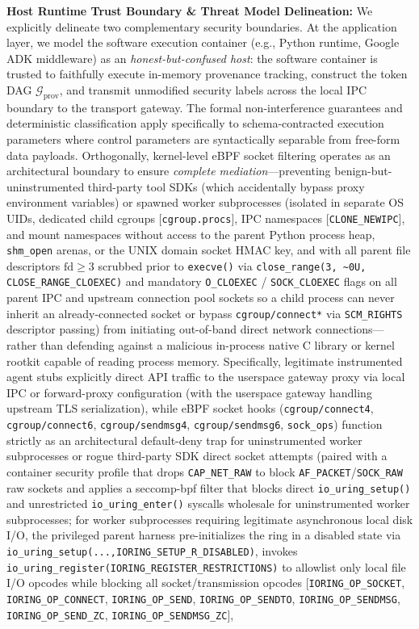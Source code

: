 \documentclass[conference,10pt]{IEEEtran}
\begin{document}
\noindent\textbf{Host Runtime Trust Boundary \& Threat Model Delineation:} We explicitly delineate two complementary security boundaries. At the application layer, we model the software execution container (e.g., Python runtime, Google ADK middleware) as an \textit{honest-but-confused host}: the software container is trusted to faithfully execute in-memory provenance tracking, construct the token DAG $\mathcal{G}_{\text{prov}}$, and transmit unmodified security labels across the local IPC boundary to the transport gateway. The formal non-interference guarantees and deterministic classification apply specifically to schema-contracted execution parameters where control parameters are syntactically separable from free-form data payloads. Orthogonally, kernel-level eBPF socket filtering operates as an architectural boundary to ensure \textit{complete mediation}---preventing benign-but-uninstrumented third-party tool SDKs (which accidentally bypass proxy environment variables) or spawned worker subprocesses (isolated in separate OS UIDs, dedicated child cgroups [\texttt{cgroup.procs}], IPC namespaces [\texttt{CLONE\_NEWIPC}], and mount namespaces without access to the parent Python process heap, \texttt{shm\_open} arenas, or the UNIX domain socket HMAC key, and with all parent file descriptors $\text{fd} \ge 3$ scrubbed prior to \texttt{execve()} via \texttt{close\_range(3, \textasciitilde{}0U, CLOSE\_RANGE\_CLOEXEC)} and mandatory \texttt{O\_CLOEXEC} / \texttt{SOCK\_CLOEXEC} flags on all parent IPC and upstream connection pool sockets so a child process can never inherit an already-connected socket or bypass \texttt{cgroup/connect*} via \texttt{SCM\_RIGHTS} descriptor passing) from initiating out-of-band direct network connections---rather than defending against a malicious in-process native C library or kernel rootkit capable of reading process memory. Specifically, legitimate instrumented agent stubs explicitly direct API traffic to the userspace gateway proxy via local IPC or forward-proxy configuration (with the userspace gateway handling upstream TLS serialization), while eBPF socket hooks (\texttt{cgroup/connect4}, \texttt{cgroup/connect6}, \texttt{cgroup/sendmsg4}, \texttt{cgroup/sendmsg6}, \texttt{sock\_ops}) function strictly as an architectural default-deny trap for uninstrumented worker subprocesses or rogue third-party SDK direct socket attempts (paired with a container security profile that drops \texttt{CAP\_NET\_RAW} to block \texttt{AF\_PACKET}/\texttt{SOCK\_RAW} raw sockets and applies a seccomp-bpf filter that blocks direct \texttt{io\_uring\_setup()} and unrestricted \texttt{io\_uring\_enter()} syscalls wholesale for uninstrumented worker subprocesses; for worker subprocesses requiring legitimate asynchronous local disk I/O, the privileged parent harness pre-initializes the ring in a disabled state via \texttt{io\_uring\_setup(\allowbreak ...,\allowbreak IORING\_SETUP\_R\_DISABLED)}, invokes \texttt{io\_uring\_register(\allowbreak IORING\_REGISTER\_RESTRICTIONS)} to allowlist only local file I/O opcodes while blocking all socket/transmission opcodes [\texttt{IORING\_OP\_SOCKET}, \texttt{IORING\_OP\_CONNECT}, \texttt{IORING\_OP\_SEND}, \texttt{IORING\_OP\_SENDTO}, \texttt{IORING\_OP\_SENDMSG}, \texttt{IORING\_OP\_SEND\_ZC}, \texttt{IORING\_OP\_SENDMSG\_ZC}], 
\end{document}
